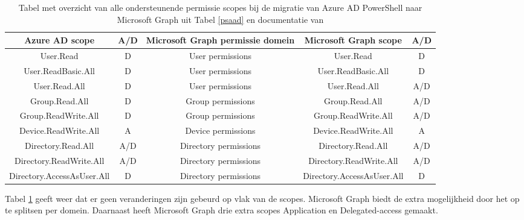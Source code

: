 \begin{table}
    \centering
    \begin{adjustbox}{max width=\textwidth}
    \begin{tabular}{ |c|c||c|c|c| } 
        \hline
        \textbf{Azure AD scope} & \textbf{A/D} & \textbf{Microsoft Graph permissie domein} & \textbf{Microsoft Graph scope} & \textbf{A/D} \\
        \hline
        User.Read & D & User permissions & User.Read & D \\
        User.ReadBasic.All & D & User permissions & User.ReadBasic.All & D \\
        User.Read.All & D & User permissions & User.Read.All & A/D \\
        Group.Read.All & D & Group permissions & Group.Read.All & A/D \\
        Group.ReadWrite.All & D & Group permissions & Group.ReadWrite.All & A/D \\
        Device.ReadWrite.All & A & Device permissions & Device.ReadWrite.All & A \\
        Directory.Read.All & A/D & Directory permissions & Directory.Read.All & A/D \\
        Directory.ReadWrite.All & A/D & Directory permissions & Directory.ReadWrite.All & A/D \\
        Directory.AccessAsUser.All & D & Directory permissions & Directory.AccessAsUser.All & D \\ 
        \hline
    \end{tabular}
    \end{adjustbox}
    \caption[Tabel migratie Azure AD permissie scopes naar Microsoft Graph]{Tabel met overzicht van alle ondersteunende permissie scopes bij de migratie van Azure \ac{AD} PowerShell naar Microsoft Graph uit Tabel \ref{psaad} en documentatie van \textcite{Microsoft2023p}}
    \label{AADMSGPS}
\end{table}

Tabel \ref{AADMSGPS} geeft weer dat er geen veranderingen zijn gebeurd op vlak van de scopes. Microsoft Graph biedt de extra mogelijkheid door het op te splitsen per domein. Daarnaast heeft Microsoft Graph drie extra scopes Application en Delegated-access gemaakt. \\
